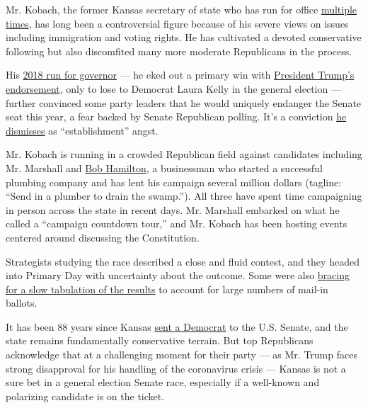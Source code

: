 Mr. Kobach, the former Kansas secretary of state who has run for office
\href{https://www.nytimes3xbfgragh.onion/2017/06/13/magazine/the-man-behind-trumps-voter-fraud-obsession.html}{multiple
times}, has long been a controversial figure because of his severe views
on issues including immigration and voting rights. He has cultivated a
devoted conservative following but also discomfited many more moderate
Republicans in the process.

His
\href{https://www.nytimes3xbfgragh.onion/2018/11/06/us/laura-kelly-wins-kansas-governors-race.html}{2018
run for governor} --- he eked out a primary win with
\href{https://www.nytimes3xbfgragh.onion/2018/08/06/us/politics/kris-kobach-trump-kansas.html}{President
Trump's endorsement}, only to lose to Democrat Laura Kelly in the
general election --- further convinced some party leaders that he would
uniquely endanger the Senate seat this year, a fear backed by Senate
Republican polling. It's a conviction
\href{https://www.nytimes3xbfgragh.onion/2020/07/30/us/politics/kansas-senate-kobach-trump.html}{he
dismisses} as ``establishment'' angst.

Mr. Kobach is running in a crowded Republican field against candidates
including Mr. Marshall and
\href{https://www.kansascity.com/news/politics-government/article244374532.html}{Bob
Hamilton}, a businessman who started a successful plumbing company and
has lent his campaign several million dollars (tagline: ``Send in a
plumber to drain the swamp.''). All three have spent time campaigning in
person across the state in recent days. Mr. Marshall embarked on what he
called a ``campaign countdown tour,'' and Mr. Kobach has been hosting
events centered around discussing the Constitution.

Strategists studying the race described a close and fluid contest, and
they headed into Primary Day with uncertainty about the outcome. Some
were also
\href{https://www.kansascity.com/news/politics-government/election/article244625722.html}{bracing
for a slow tabulation of the results} to account for large numbers of
mail-in ballots.

It has been 88 years since Kansas
\href{https://www.nytimes3xbfgragh.onion/2020/05/30/us/politics/kansas-senate-kobach.html}{sent
a Democrat} to the U.S. Senate, and the state remains fundamentally
conservative terrain. But top Republicans acknowledge that at a
challenging moment for their party --- as Mr. Trump faces strong
disapproval for his handling of the coronavirus crisis --- Kansas is not
a sure bet in a general election Senate race, especially if a well-known
and polarizing candidate is on the ticket.

